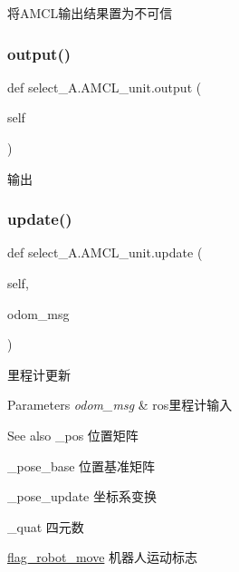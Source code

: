 将\+A\+M\+C\+L输出结果置为不可信 

\mbox{\label{classselect___a_1_1_a_m_c_l__unit_a5c23f7326d10c0224a5115a8bffbb64e}} 
\subsubsection{\texorpdfstring{output()}{output()}}
{\footnotesize\ttfamily def select\+\_\+\+A.\+A\+M\+C\+L\+\_\+unit.\+output (\begin{DoxyParamCaption}\item[{}]{self }\end{DoxyParamCaption})}



输出 

\mbox{\label{classselect___a_1_1_a_m_c_l__unit_aee2f9bf2fbf4ad2a59d32b00533e33ab}} 
\subsubsection{\texorpdfstring{update()}{update()}}
{\footnotesize\ttfamily def select\+\_\+\+A.\+A\+M\+C\+L\+\_\+unit.\+update (\begin{DoxyParamCaption}\item[{}]{self,  }\item[{}]{odom\+\_\+msg }\end{DoxyParamCaption})}



里程计更新 


\begin{DoxyParams}{Parameters}
{\em odom\+\_\+msg} & ros里程计输入\\
\hline
\end{DoxyParams}
\begin{DoxySeeAlso}{See also}
\+\_\+pos 位置矩阵 

\+\_\+pose\+\_\+base 位置基准矩阵 

\+\_\+pose\+\_\+update 坐标系变换 

\+\_\+quat 四元数 

\hyperlink{namespaceselect___a_af5f7c62998c1bd067d53a259ca8a256c}{flag\+\_\+robot\+\_\+move} 机器人运动标志 
\end{DoxySeeAlso}


